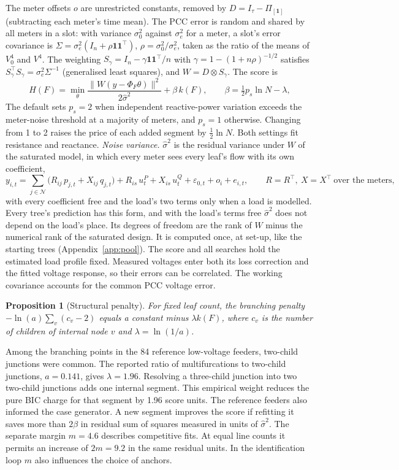 \documentclass[journal,onecolumn,11pt]{IEEEtran}
\newtheorem{proposition}{Proposition}
\newcommand{\tp}{^{\top}}
\newcommand{\one}{\mathbf{1}}
\newcommand{\Nset}{\mathcal{N}}
\begin{document}
The meter offsets $o$ are unrestricted constants, removed by $D=I_\tau-\Pi_{[\one]}$ (subtracting each
meter's time mean). The PCC error is random and shared by all meters in a slot: with variance $\sigma_0^2$ against
$\sigma_e^2$ for a meter, a slot's error covariance is $\Sigma=\sigma_e^2(I_n+\rho\one\one\tp)$, $\rho=\sigma_0^2/\sigma_e^2$,
taken as the ratio of the means of $V_0^4$ and $V^4$. The weighting $S_\gamma=I_n-\gamma\one\one\tp/n$ with $\gamma=1-(1+n\rho)^{-1/2}$ satisfies
$S_\gamma\tp S_\gamma=\sigma_e^2\Sigma^{-1}$ (generalised least squares), and $W=D\otimes S_\gamma$. The score is
\begin{equation}\label{eq:score}
H(F)=\min_{\theta}\frac{\|W(y-\Phi_F\theta)\|^2}{2\hat\sigma^2}+\beta\,k(F),\qquad\beta=\tfrac12p_s\ln N-\lambda,
\end{equation}
The default sets $p_s=2$ when independent reactive-power variation exceeds the meter-noise threshold at a
majority of meters, and $p_s=1$ otherwise. Changing from 1 to 2 raises the price of each added segment by
$\tfrac12\ln N$. Both settings fit resistance and reactance.
\emph{Noise variance.} $\hat\sigma^2$ is the residual variance under $W$ of the saturated model, in which every meter sees
every leaf's flow with its own coefficient,
\begin{equation}\label{eq:sat}
y_{i,t}=\sum_{j\in\Nset}\big(R_{ij}\,p_{j,t}+X_{ij}\,q_{j,t}\big)+R_{is}\,u^P_t+X_{is}\,u^Q_t+\varepsilon_{0,t}+o_i+e_{i,t},
\qquad R=R\tp,\ X=X\tp\ \text{over the meters},
\end{equation}
with every coefficient free and the load's two terms only when a load is modelled. Every tree's prediction has this form, and
with the load's terms free $\hat\sigma^2$ does not depend on the load's place. Its degrees of freedom are the rank of $W$ minus
the numerical rank of the saturated design. It is computed once, at set-up, like the starting trees
(Appendix~\ref{app:pool}). The score and all searches hold the estimated load profile fixed. Measured voltages
enter both its loss correction and the fitted voltage response, so their errors can be correlated. The working
covariance accounts for the common PCC voltage error.
\begin{proposition}[Structural penalty]\label{prop:prior}
For fixed leaf count, the branching penalty $-\ln(a)\sum_v(c_v-2)$ equals a constant minus $\lambda k(F)$,
where $c_v$ is the number of children of internal node $v$ and $\lambda=\ln(1/a)$.
\end{proposition}
Among the branching points in the 84 reference low-voltage feeders, two-child junctions were common. The reported
ratio of multifurcations to two-child junctions, $a=0.141$, gives $\lambda=1.96$. Resolving a three-child junction
into two two-child junctions adds one internal segment. This empirical weight reduces the pure BIC charge for
that segment by 1.96 score units. The reference feeders also informed the case generator.
A new segment improves the score if refitting it saves more than $2\beta$ in residual sum of squares measured in
units of $\hat\sigma^2$. The separate margin $m=4.6$ describes competitive fits. At equal line counts it permits
an increase of $2m=9.2$ in the same residual units. In the identification loop $m$ also influences the choice of anchors.
\end{document}
